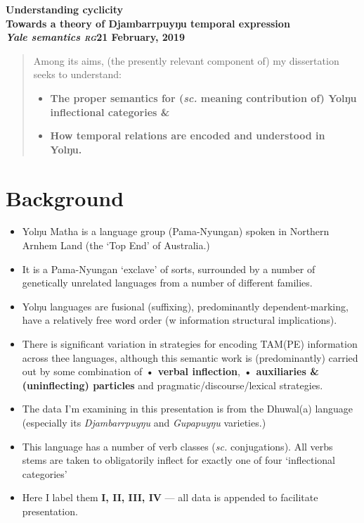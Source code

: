 \documentclass[11pt,dvipsnames]{article}
\begin{document}
\noindent\textbf{\Large{Understanding cyclicity}\\
\large{Towards a theory of Djambarrpuyŋu temporal expression}\\
\small{\textit{Yale semantics \textsc{rg}}\hfill 21 February, 2019}}

\vspace*{3em}
\begin{abstract}
\noindent	Among its aims, (the presently relevant component of) my dissertation seeks to understand:
	

	\begin{itemize}
		\item \textbf{The proper semantics for (\textit{sc.} meaning contribution of) Yolŋu inflectional categories \&}
		\item \textbf{How temporal relations are encoded and understood in Yolŋu.}
\end{itemize}
\end{abstract}

\gathertags

\section*{Background}

\begin{itemize}
	\item Yolŋu Matha is a language group (Pama-Nyungan) spoken in Northern Arnhem Land (the `Top End' of Australia.)
	\item It is a Pama-Nyungan `exclave' of sorts, surrounded by a number of genetically unrelated languages from a number of different families.
	\item Yolŋu languages are fusional (suffixing), predominantly dependent-marking, have a relatively free word order  (w information structural implications).
	\item There is significant variation in strategies for encoding TAM(PE) information across thee languages, although this semantic work is (predominantly) carried out by some combination of \textbf{• verbal inflection}, \textbf{• auxiliaries \& (uninflecting) particles} and pragmatic/discourse/lexical strategies.
	\item The data I'm examining in this presentation is from the Dhuwal(a) language (especially its \textit{Djambarrpuyŋu} and \textit{Gupapuyŋu} varieties.)
	\item This language has a number of verb classes (\textit{sc. }conjugations). All verbs stems are taken to obligatorily inflect for exactly one of four `inflectional categories'
	\item Here I label them \textbf{I, II, III, IV} --- all data is appended to facilitate presentation.
	\end{itemize}
\end{document}
